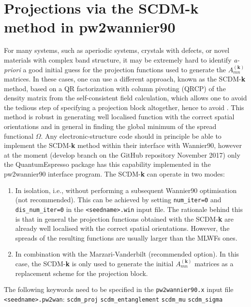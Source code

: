 \section{Projections via the SCDM-\textbf{k} method in pw2wannier90}
For many systems, such as aperiodic systems, crystals with defects, or novel materials with complex band structure,  it may be extremely hard to identify \emph{a-priori} a good initial guess for the projection functions used to generate the $A_{mn}^{(\mathbf{k})}$ matrices. In these cases, one can use a different approach, known as the SCDM-\textbf{k} method\cite{LinLin-ArXiv2017}, based on a QR factorization with column pivoting (QRCP) of the density matrix from the self-consistent field calculation, which allows one to avoid the tedious step of specifying a projection block altogether, hence to avoid . This method is robust in generating well localised function with the correct spatial orientations and in general in finding the global minimum of the spread functional $\Omega$. Any electronic-structure code should in principle be able to implement the SCDM-\textbf{k} method within their interface with Wannier90, however at the moment (develop branch on the GitHub repository November 2017) only the QuantumEspresso package has this capability implemented in the pw2wannier90 interface program.
 The SCDM-\textbf{k} can operate in two modes: 
\begin{enumerate}
\item In isolation, i.e., without performing a subsequent Wannier90 optimisation (not recommended). This can be achieved by setting {\tt num\_iter=0} and {\tt dis\_num\_iter=0} in the \verb#<seedname>.win# input file. The rationale behind this is that in general the projection functions obtained with the SCDM-\textbf{k} are already well localised with the correct spatial orientations. However, the spreads of the resulting functions are usually larger than the MLWFs ones.  
\item In combination with the Marzari-Vanderbilt (recommended option). In this case, the SCDM-\textbf{k} is only used to generate the initial $A_{mn}^{(\mathbf{k})}$ matrices as a replacement scheme for the projection block.
\end{enumerate}

The following keywords need to be specified in the {\tt pw2wannier90.x} input file \verb#<seedname>.pw2wan#:
\noindent
\verb#scdm_proj#
\verb#scdm_entanglement#
\verb#scdm_mu#
\verb#scdm_sigma#
\noindent
